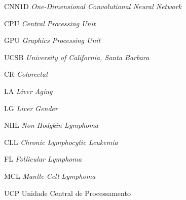 \documentclass[
  12pt,		
  a4paper,	
  openright,  
  oneside,	
  chapter=TITLE,		
  section=TITLE,		
  english,	
  french,	    
  spanish,	
  brazil	    
]{abntex2}
\begin{document}
\begin{siglas}
        \item [CNN1D] \textit{One-Dimensional Convolutional Neural Network}
        \item [CPU] \textit{Central Processing Unit}
        \item [GPU] \textit{Graphics Processing Unit}
        \item [UCSB] \textit{University of California, Santa Barbara}
        \item [CR] \textit{Colorectal}
        \item [LA] \textit{Liver Aging}
        \item [LG] \textit{Liver Gender}
        \item [NHL] \textit{Non-Hodgkin Lymphoma}
        \item [CLL] \textit{Chronic Lymphocytic Leukemia}
        \item [FL] \textit{Follicular Lymphoma}
        \item [MCL] \textit{Mantle Cell Lymphoma}
        \item [UCP] Unidade Central de Processamento
    \end{siglas}  
\end{document}
